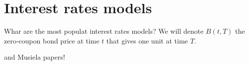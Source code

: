 \section{Interest rates models}

\begin{tcolorbox}[width=\linewidth, sharp corners=all, colback=white!95!black]
Whar are the most populat interest rates models? We will denote $B(t,T)$ the zero-coupon bond price at time $t$ that gives one unit at time $T$.
\end{tcolorbox}

and Musiela papers!